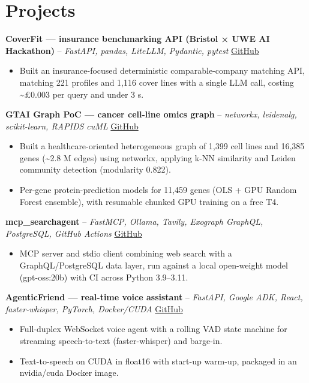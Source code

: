 \documentclass[a4paper,11pt]{article}
\begin{document}
\section{Projects}
\noindent\textbf{CoverFit — insurance benchmarking API (Bristol × UWE AI Hackathon)} -- \textit{FastAPI, pandas, LiteLLM, Pydantic, pytest} \hfill \href{https://github.com/Thiruvel-AP/AIHackathon-Phoenix}{GitHub}
\begin{itemize}
  \item Built an insurance-focused deterministic comparable-company matching API, matching 221 profiles and 1,116 cover lines with a single LLM call, costing \textasciitilde{}£0.003 per query and under 3 s.
\end{itemize}
\vspace{3pt}
\noindent\textbf{GTAI Graph PoC — cancer cell-line omics graph} -- \textit{networkx, leidenalg, scikit-learn, RAPIDS cuML} \hfill \href{https://github.com/Thiruvel-AP/GTAI-GraphPOC}{GitHub}
\begin{itemize}
  \item Built a healthcare-oriented heterogeneous graph of 1,399 cell lines and 16,385 genes (\textasciitilde{}2.8 M edges) using networkx, applying k-NN similarity and Leiden community detection (modularity 0.822).
  \item Per-gene protein-prediction models for 11,459 genes (OLS + GPU Random Forest ensemble), with resumable chunked GPU training on a free T4.
\end{itemize}
\vspace{3pt}
\noindent\textbf{mcp\_searchagent} -- \textit{FastMCP, Ollama, Tavily, Exograph GraphQL, PostgreSQL, GitHub Actions} \hfill \href{https://github.com/Thiruvel-AP/mcp_searchagent}{GitHub}
\begin{itemize}
  \item MCP server and stdio client combining web search with a GraphQL/PostgreSQL data layer, run against a local open-weight model (gpt-oss:20b) with CI across Python 3.9–3.11.
\end{itemize}
\vspace{3pt}
\noindent\textbf{AgenticFriend — real-time voice assistant} -- \textit{FastAPI, Google ADK, React, faster-whisper, PyTorch, Docker/CUDA} \hfill \href{https://github.com/Thiruvel-AP/adk_multi-agent}{GitHub}
\begin{itemize}
  \item Full-duplex WebSocket voice agent with a rolling VAD state machine for streaming speech-to-text (faster-whisper) and barge-in.
  \item Text-to-speech on CUDA in float16 with start-up warm-up, packaged in an nvidia/cuda Docker image.
\end{itemize}
\end{document}
